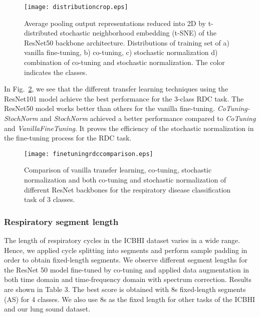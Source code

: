 \documentclass[journal]{IEEEtran}
\begin{document}
\begin{figure}[t]
	\centering
    \texttt{[image: distributioncrop.eps]}
	\caption{Average pooling output representations reduced into 2D by t-distributed stochastic neighborhood embedding (t-SNE) of the ResNet50 backbone architecture. Distributions of training set of a) vanilla fine-tuning, b) co-tuning, c) stochastic normalization d) combination of co-tuning and stochastic normalization. The color indicates the classes.}
	\label{fig:tsnecomparision}
\end{figure}

In Fig.~\ref{fig:finetuningcomparision_disease}, we see that the different transfer learning techniques using the ResNet101 model achieve the best performance for the 3-class RDC task. The ResNet50 model works better than others for the vanilla fine-tuning. \textit{CoTuning-StochNorm} and \textit{StochNorm} achieved a better performance compared to \textit{CoTuning} and \textit{VanillaFineTuning}. It proves the efficiency of the stochastic normalization in the fine-tuning process for the RDC task.  

\begin{figure}[t]
	\centering
    \texttt{[image: finetuningrdccomparison.eps]}
	\caption{Comparison of vanilla transfer learning, co-tuning, stochastic normalization and both co-tuning and stochastic normalization of different ResNet backbones for the respiratory disease classification task of 3 classes.}
	\label{fig:finetuningcomparision_disease}
\end{figure}
\subsubsection{Respiratory segment length}
The length of respiratory cycles in the ICBHI dataset varies in a wide range. Hence, we applied cycle splitting into segments and perform sample padding in order to obtain fixed-length segments. We observe different segment lengths for the ResNet 50 model fine-tuned by co-tuning and applied data augmentation in both time domain and time-frequency domain with spectrum correction. Results are shown in Table 3. The best score is obtained with 8s fixed-length segments (AS) for 4 classes. We also use 8s as the fixed length for other tasks of the ICBHI and our lung sound dataset.
\end{document}

